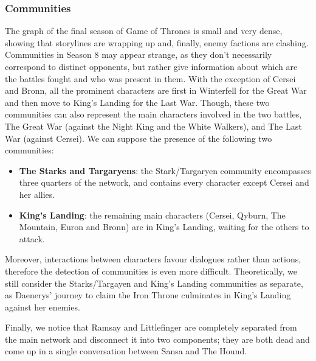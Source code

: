 \documentclass[10pt,twocolumn,letterpaper]{article}
\begin{document}
\subsubsection{Communities}

The graph of the final season of Game of Thrones is small and very dense, showing that storylines are wrapping up and, finally, enemy factions are clashing. Communities in Season 8 may appear strange, as they don't necessarily correspond to distinct opponents, but rather give information about which are the battles fought and who was present in them. With the exception of Cersei and Bronn, all the prominent characters are first in Winterfell for the Great War and then move to King’s Landing for the Last War. Though, these two communities can also represent the main characters involved in the two battles, The Great War (against the Night King and the White Walkers), and The Last War (against Cersei). 
We can suppose the presence of the following two communities:
\begin{itemize}
    \item \textbf{The Starks and Targaryens}: the Stark/Targaryen community encompasses three quarters of the network, and contains every character except Cersei and her allies. 
    \item \textbf{King's Landing}: the remaining main characters (Cersei, Qyburn, The Mountain, Euron and Bronn) are in King's Landing, waiting for the others to attack.
\end{itemize}

Moreover, interactions between characters favour dialogues rather than actions, therefore the detection of communities is even more difficult.
Theoretically, we still consider the Starks/Targayen and King's Landing communities as separate, as Daenerys' journey to claim the Iron Throne culminates in King's Landing against her enemies.

Finally, we notice that Ramsay and Littlefinger are completely separated from the main network and disconnect it into two components; they are both dead and come up in a single conversation between Sansa and The Hound.
\end{document}
